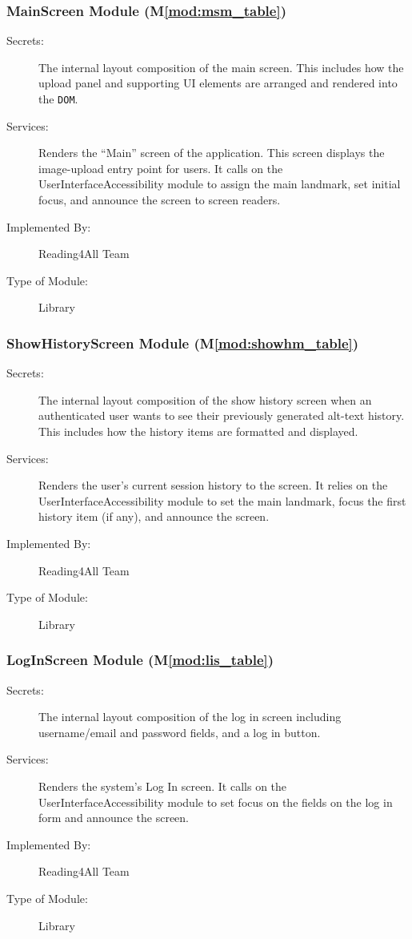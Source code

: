 \documentclass[12pt, titlepage]{article}
\newcommand{\mref}[1]{M\ref{#1}}
\begin{document}
\subsubsection{MainScreen Module (\mref{mod:msm_table})}
\label{mod:msm}
\begin{description}
  \item[Secrets:] The internal layout composition of the main screen.
    This includes how the upload panel and supporting UI elements are
    arranged and rendered into the \texttt{DOM}.
  \item[Services:] Renders the “Main” screen of the application. This
    screen displays the image-upload entry point for users.
    It calls on the UserInterfaceAccessibility module
    to assign the main landmark, set initial focus, and announce the
    screen to screen readers.
  \item[Implemented By:] Reading4All Team
  \item[Type of Module:] Library
\end{description}

\subsubsection{ShowHistoryScreen Module (\mref{mod:showhm_table})}
\label{mod:showhm}
\begin{description}
  \item[Secrets:] The internal layout composition of the show history
    screen when an authenticated user wants to see their
    previously generated alt-text history. This includes how the
    history items are formatted and displayed.
  \item[Services:] Renders the user’s current session history to the
    screen. It relies on the UserInterfaceAccessibility module
    to set the main landmark, focus the first history item (if any),
    and announce the screen.
  \item[Implemented By:] Reading4All Team
  \item[Type of Module:] Library
\end{description}

\subsubsection{LogInScreen Module (\mref{mod:lis_table})}
\label{mod:lis}
\begin{description}
  \item[Secrets:] The internal layout composition of the log in
    screen including username/email and password fields, and
    a log in button.
  \item[Services:] Renders the system’s Log In screen. It calls on
    the UserInterfaceAccessibility module
    to set focus on the fields on the log in form and announce the screen.
  \item[Implemented By:] Reading4All Team
  \item[Type of Module:] Library
\end{description}
\end{document}
